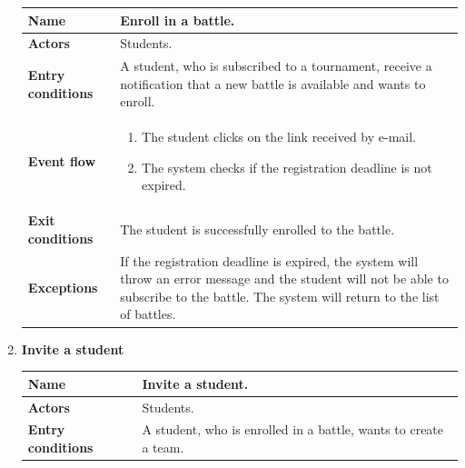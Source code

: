 \begin{enumerate}[label=\textbf{UC.\arabic*}]
        \begin{table}[H]
    	    \centering
                \renewcommand{\arraystretch}{1.5}
                \begin{tabular}{|m{3.2cm}|m{9.8cm}|}
                    \hline
                    \textbf{Name} & Enroll in a battle. \\
                    \hline
                    \textbf{Actors} & Students. \\
                    \hline
                    \textbf{Entry conditions}  & A student, who is subscribed to a tournament, receive a notification that a new battle is available and wants to enroll.\\
                    \hline
                    \textbf{Event flow}  & 
                    \begin{enumerate}[label=\arabic*.]
                        \item The student clicks on the link received by e-mail.
                        \item The system checks if the registration deadline is not expired.
                    \end{enumerate}\\ 
                    \hline
                    \textbf{Exit conditions}  & The student is successfully enrolled to the battle. \\
                    \hline
                    \textbf{Exceptions}  & If the registration deadline is expired, the system will throw an error message and the student will not be able to subscribe to the battle. The system will return to the list of battles.  \\
                    \hline 
                \end{tabular}
        \end{table}
        \item {} \textbf{Invite a student}
        \begin{table}[H]
    	    \centering
                \renewcommand{\arraystretch}{1.5}
                \begin{tabular}{|m{3.2cm}|m{9.8cm}|}
                    \hline
                    \textbf{Name} & Invite a student. \\
                    \hline
                    \textbf{Actors} & Students. \\
                    \hline
                    \textbf{Entry conditions}  & A student, who is enrolled in a battle, wants to create a team. \\

\end{tabular}
\end{table}
\end{enumerate}
